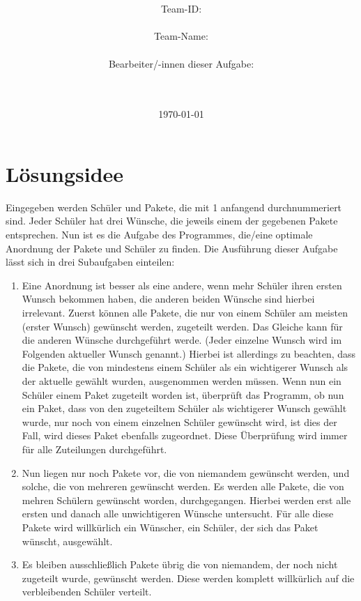 \documentclass[a4paper,10pt,ngerman]{scrartcl}
\title{\textbf{\Huge\Aufgabe}}
\author{\LARGE Team-ID: \LARGE \TeamId \\\\
	    \LARGE Team-Name: \LARGE \TeamName \\\\
	    \LARGE Bearbeiter/-innen dieser Aufgabe: \\ 
	    \LARGE \Namen\\\\}
\date{\LARGE\today}
\begin{document}
\maketitle
\tableofcontents

\vspace{0.5cm}

\section{Lösungsidee}
\label{sec:loe}

Eingegeben werden Schüler und Pakete, die mit 1 anfangend durchnummeriert sind.
Jeder Schüler hat drei Wünsche, die jeweils einem der gegebenen Pakete entsprechen.
Nun ist es die Aufgabe des Programmes, die/eine optimale Anordnung der Pakete und Schüler zu finden.
Die Ausführung dieser Aufgabe lässt sich in drei Subaufgaben einteilen:
\begin{enumerate}
    \item Eine Anordnung ist besser als eine andere, wenn mehr Schüler ihren ersten Wunsch bekommen haben, die anderen beiden Wünsche sind hierbei irrelevant.
    Zuerst können alle Pakete, die nur von einem Schüler am meisten (erster Wunsch) gewünscht werden, zugeteilt werden.
    Das Gleiche kann für die anderen Wünsche durchgeführt werde.
    (Jeder einzelne Wunsch wird im Folgenden \glqq aktueller Wunsch\grqq{} genannt.)
    Hierbei ist allerdings zu beachten, dass die Pakete, die von mindestens einem Schüler als ein wichtigerer Wunsch als der aktuelle gewählt wurden, ausgenommen werden müssen.
    Wenn nun ein Schüler einem Paket zugeteilt worden ist, überprüft das Programm, ob nun ein Paket, dass von den zugeteiltem Schüler als wichtigerer Wunsch gewählt wurde, nur noch von einem einzelnen Schüler gewünscht wird, ist dies der Fall, wird dieses Paket ebenfalls zugeordnet.
    Diese Überprüfung wird immer für alle Zuteilungen durchgeführt.
    \item Nun liegen nur noch Pakete vor, die von niemandem gewünscht werden, und solche, die von mehreren gewünscht werden.
    Es werden alle Pakete, die von mehren Schülern gewünscht worden, durchgegangen. Hierbei werden erst alle ersten und danach alle unwichtigeren Wünsche untersucht.
    Für alle diese Pakete wird willkürlich ein Wünscher, ein Schüler, der sich das Paket wünscht, ausgewählt.
    \item Es bleiben ausschließlich Pakete übrig die von niemandem, der noch nicht zugeteilt wurde, gewünscht werden. Diese werden komplett willkürlich auf die verbleibenden Schüler verteilt.
\end{enumerate}
\end{document}
